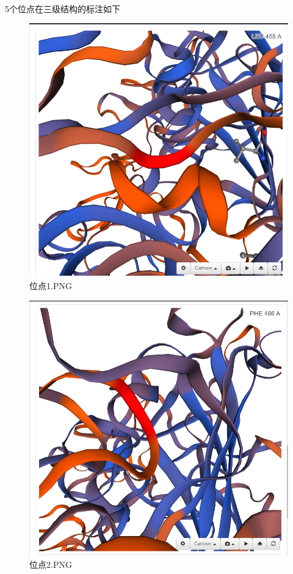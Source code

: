 \documentclass[supercite]{HustGraduPaper}
\begin{document}
		\paragraph{}\label{subpara:subpara}5个位点在三级结构的标注如下
		\begin{figure}[H]
			\centering
			\includegraphics[width=1\textwidth]{./material/practice4/ACE2_1.png}
			\caption{位点1.PNG}
		\end{figure}
		\begin{figure}[H]
			\centering
			\includegraphics[width=1\textwidth]{./material/practice4/ACE2_2.png}
			\caption{位点2.PNG}
		\end{figure}
\end{document}
